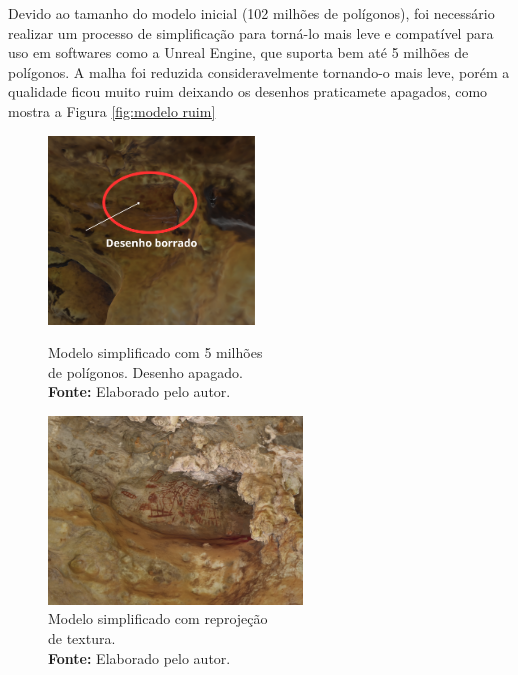 Devido ao tamanho do modelo inicial (102 milhões de polígonos), foi necessário realizar um processo de simplificação para torná-lo mais leve e compatível para uso em softwares como a Unreal Engine, que suporta bem até 5 milhões de polígonos. A malha foi reduzida consideravelmente tornando-o mais leve, porém a qualidade ficou muito ruim deixando os desenhos praticamete apagados, como mostra a Figura \ref{fig:modelo ruim}

\begin{figure}[H]
    \centering
    \begin{minipage}{0.45\textwidth} %
        \centering
        \includegraphics[height=5cm, keepaspectratio]{img/reality e fotogrametria processo/modelo ruim.png}
        \caption{Modelo simplificado com 5 milhões \\ de polígonos. Desenho apagado. \\
            \textbf{Fonte:} Elaborado pelo autor.}
        \label{fig:modelo ruim}
    \end{minipage}
    \hspace{1cm} %
    \begin{minipage}{0.45\textwidth} %
        \centering
        \includegraphics[height=5cm, keepaspectratio]{img/reality e fotogrametria processo/desenho bom retroprojeção.png}
        \caption{Modelo simplificado com reprojeção \\ de textura. \\
            \textbf{Fonte:} Elaborado pelo autor.}
        \label{fig:desenho bom}
    \end{minipage}
\end{figure}


